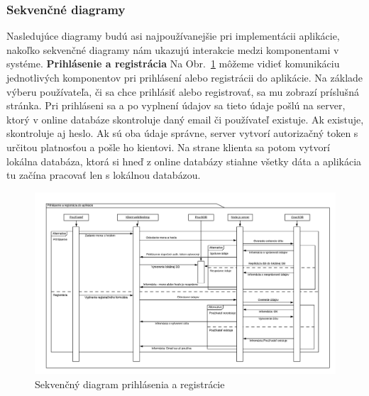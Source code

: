 \subsubsection{Sekvenčné diagramy}
\indent Nasledujúce diagramy budú asi najpoužívanejšie pri implementácii aplikácie, nakoľko sekvenčné diagramy nám ukazujú interakcie medzi komponentami v systéme.
\newline
\newline
\textbf{Prihlásenie a registrácia} \newline
\indent Na Obr.~\ref{fig:seq_login} môžeme vidieť komunikáciu jednotlivých komponentov pri prihlásení alebo registrácii do aplikácie. Na základe výberu používateľa, či sa chce prihlásiť alebo registrovať, sa mu zobrazí príslušná stránka. Pri prihláseni sa a po vyplnení údajov sa tieto údaje pošlú na server, ktorý v online databáze skontroluje daný email či používateľ existuje. Ak existuje, skontroluje aj heslo. Ak sú oba údaje správne, server vytvorí autorizačný token s určitou platnosťou a pošle ho kientovi. Na strane klienta sa potom vytvorí lokálna databáza, ktorá si hneď z online databázy stiahne všetky dáta a aplikácia tu začína pracovať len s lokálnou databázou. 

\begin{figure}[H]
    \centering
    \includegraphics[scale=0.50]{img/Seq_login_register.png}
    \caption{Sekvenčný diagram prihlásenia a registrácie}
    \label{fig:seq_login}
\end{figure}

